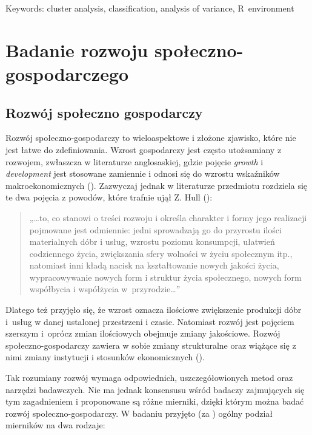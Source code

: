 \documentclass{amuthesis}
\begin{document}
Keywords: cluster analysis, classification, analysis of variance, R~environment

\newpage

\sf\tighttoc\doublespacing

\hypertarget{Rozwoj}{%
\chapter{Badanie rozwoju społeczno-gospodarczego}\label{Rozwoj}}

\hypertarget{badane}{%
\section{Rozwój społeczno gospodarczy}\label{badane}}

Rozwój społeczno-gospodarczy to wieloaspektowe i złożone zjawisko, które nie jest łatwe do zdefiniowania.
Wzrost gospodarczy jest często utożsamiany z rozwojem, zwłaszcza w literaturze anglosaskiej, gdzie pojęcie \emph{growth} i \emph{development} jest stosowane zamiennie i odnosi się do wzrostu wskaźników makroekonomicznych (\textcite{borys}).
Zazwyczaj jednak w literaturze przedmiotu rozdziela się te dwa pojęcia z powodów, które trafnie ujął Z. Hull (\textcite{hull}):

\begin{quote}
„\ldots to, co stanowi o treści rozwoju i określa charakter i formy jego realizacji pojmowane jest odmiennie: jedni sprowadzają go do przyrostu ilości materialnych dóbr i usług, wzrostu poziomu konsumpcji, ułatwień codziennego życia, zwiększania sfery wolności w życiu społecznym itp., natomiast inni kładą nacisk na kształtowanie nowych jakości życia, wypracowywanie nowych form i struktur życia społecznego, nowych form współbycia i współżycia w~przyrodzie\ldots''
\end{quote}

Dlatego też przyjęło się, że wzrost oznacza ilościowe zwiększenie produkcji dóbr i~usług w danej ustalonej przestrzeni i czasie.
Natomiast rozwój jest pojęciem szerszym i~oprócz zmian ilościowych obejmuje zmiany jakościowe.
Rozwój społeczno-gospodarczy zawiera w sobie zmiany strukturalne oraz wiążące się z nimi zmiany instytucji i stosunków ekonomicznych (\textcite{pajak}).

Tak rozumiany rozwój wymaga odpowiednich, uszczegółowionych metod oraz narzędzi badawczych.
Nie ma jednak konsensusu wśród badaczy zajmujących się tym zagadnieniem i proponowane są różne mierniki, dzięki którym można badać rozwój społeczno-gospodarczy.
W badaniu przyjęto (za \textcite{opallo}) ogólny podział mierników na dwa rodzaje:
\end{document}
